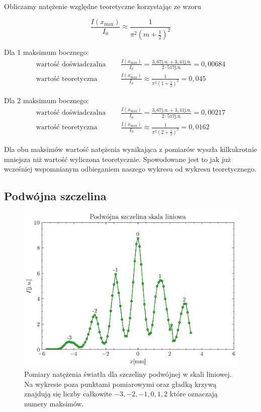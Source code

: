 \documentclass{fizykalab}
\newcommand{\ju}{\ensuremath{\text{j.u.}}}
\begin{document}
Obliczamy natężenie względne teoretyczne korzystając ze wzoru

\begin{equation*}
    \frac{I(x_\text{max})}{I_0} \approx \frac{1}{\pi^2 (m + \frac{1}{2})^2}
\end{equation*}

Dla 1 maksimum bocznego:
\begin{align*}
    \text{wartość doświadczalna  } \quad &\frac{I(x_\text{max})}{I_0} = \frac{3,67 \ju + 3,41 \ju}{2 \cdot 517 \ju} = 0,00684 \\
    \text{wartość teoretyczna  } \quad &\frac{I(x_\text{max})}{I_0} \approx \frac{1}{\pi^2 (1 + \frac{1}{2})^2} = 0,045
\end{align*}

Dla 2 maksimum bocznego:
\begin{align*}
    \text{wartość doświadczalna  } \quad & \frac{I(x_\text{max})}{I_0} = \frac{3,67 \ju + 3,41 \ju}{2 \cdot 517 \ju} = 0,00217 \\
    \text{wartość teoretyczna  } \quad & \frac{I(x_\text{max})}{I_0} \approx \frac{1}{\pi^2 (2 + \frac{1}{2})^2} = 0,0162
\end{align*}

Dla obu maksimów wartość natężenia wynikająca z pomiarów wyszła kilkukrotnie mniejsza niż wartość wyliczona teoretycznie. Spowodowane jest to jak już wcześniej wspomnianym odbieganiem naszego wykresu od wykresu teoretycznego.

\subsection{Podwójna szczelina}

\begin{figure}[H]
    \centering
    \includegraphics[width=0.65\linewidth]{powdojna_liniowa_numery_maksimum.png}
    \caption{Pomiary natężenia światła dla szczeliny podwójnej w skali liniowej.
    Na wykresie poza punktami pomiarowymi oraz gładką krzywą znajdują się liczby
    całkowite $-3, -2, -1, 0, 1, 2$ które oznaczają numery maksimów.
    }
\end{figure}
\end{document}
